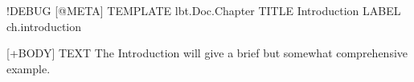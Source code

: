 \begin{lbt}
  !DEBUG
  [@META]
    TEMPLATE lbt.Doc.Chapter
    TITLE Introduction
    LABEL ch.introduction

  [+BODY]
    TEXT The Introduction will give a brief but somewhat comprehensive example.

\end{lbt}
